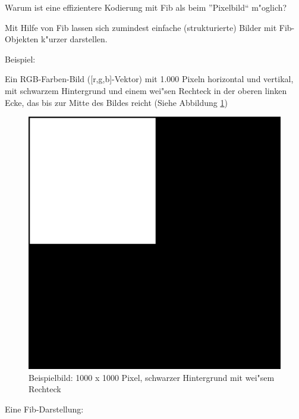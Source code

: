 \begin{flushleft}
Warum ist eine effizientere Kodierung mit Fib als beim ''Pixelbild`` m"oglich?

Mit Hilfe von Fib lassen sich zumindest einfache (strukturierte) Bilder mit Fib-Objekten k"urzer darstellen.

\bigskip\noindent
Beispiel:

Ein RGB-Farben-Bild ([r,g,b]-Vektor) mit 1.000 Pixeln horizontal und vertikal, mit schwarzem Hintergrund und einem wei"sen Rechteck in der oberen linken Ecke, das bis zur Mitte des Bildes reicht (Siehe Abbildung \ref{figExampleBlackBackgroundWithWhithArea})

\begin{figure}[htbp]
\begin{center}
  \includegraphics[scale=0.2]{p1000x1000s_weisses_quadrat}
\end{center}
\caption{Beispielbild: 1000 x 1000 Pixel, schwarzer Hintergrund mit wei"sem Rechteck}
\label{figExampleBlackBackgroundWithWhithArea}
\end{figure}

\bigskip\noindent
Eine Fib-Darstellung:


\end{flushleft}
